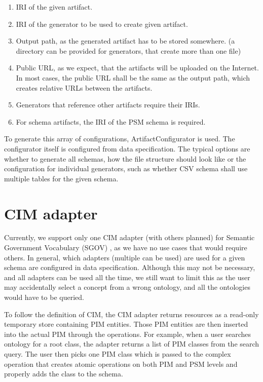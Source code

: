\begin{enumerate}
    \item IRI of the given artifact.
    \item IRI of the generator to be used to create given artifact.
    \item Output path, as the generated artifact has to be stored somewhere. (a directory can be provided for generators, that create more than one file)
    \item Public URL, as we expect, that the artifacts will be uploaded on the Internet. In most cases, the public URL shall be the same as the output path, which creates relative URLs between the artifacts.
    \item Generators that reference other artifacts require their IRIs.
    \item For schema artifacts, the IRI of the PSM schema is required.
\end{enumerate}

To generate this array of configurations, ArtifactConfigurator is used. The configurator itself is configured from data specification. The typical options are whether to generate all schemas, how the file structure should look like or the configuration for individual generators, such as whether CSV schema shall use multiple tables for the given schema.

\section{CIM adapter}

Currently, we support only one CIM adapter (with others planned) for Semantic Government Vocabulary (SGOV) \cite{kvremen2019improving}, as we have no use cases that would require others. In general, which adapters (multiple can be used) are used for a given schema are configured in data specification. Although this may not be necessary, and all adapters can be used all the time, we still want to limit this as the user may accidentally select a concept from a wrong ontology, and all the ontologies would have to be queried.

To follow the definition of CIM, the CIM adapter returns resources as a read-only temporary store containing PIM entities. Those PIM entities are then inserted into the actual PIM through the operations. For example, when a user searches ontology for a root class, the adapter returns a list of PIM classes from the search query. The user then picks one PIM class which is passed to the complex operation that creates atomic operations on both PIM and PSM levels and properly adds the class to the schema.

